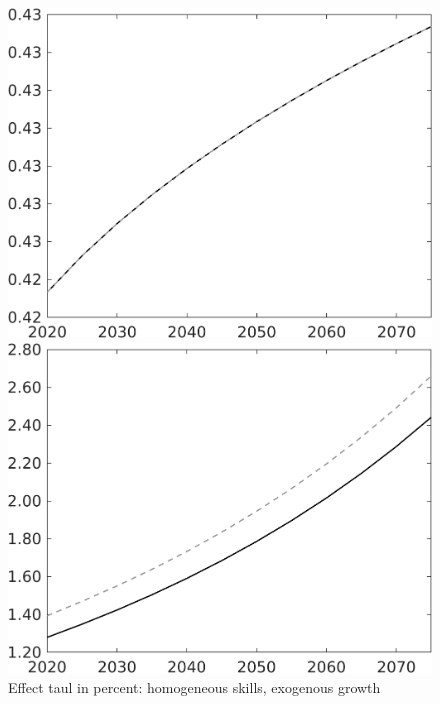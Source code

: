 \documentclass[12pt]{article}
\begin{document}
\begin{figure}[h!!]
	\centering
	\caption{Effect taul in percent: homogeneous skills, exogenous growth}\label{fig:LF_BAU_nsk1_xgr12}
	
	\begin{minipage}[]{0.32\textwidth}
		\includegraphics[width=1\textwidth]{../../codding_model/own_basedOnFried/optimalPol_010922_revision/figures/all_13Sept22/CompTaul_LFBAU_Reg0_EY_spillover0_nsk1_xgr1_knspil0_sep1_countec0_GovRev0_etaa0.79_lgd0.png}
	\end{minipage}	
	\begin{minipage}[]{0.32\textwidth}
		\includegraphics[width=1\textwidth]{../../codding_model/own_basedOnFried/optimalPol_010922_revision/figures/all_13Sept22/CompTaul_LFBAU_Reg0_N_spillover0_nsk1_xgr1_knspil0_sep1_countec0_GovRev0_etaa0.79_lgd0.png}

\end{minipage}
\end{figure}
\end{document}
